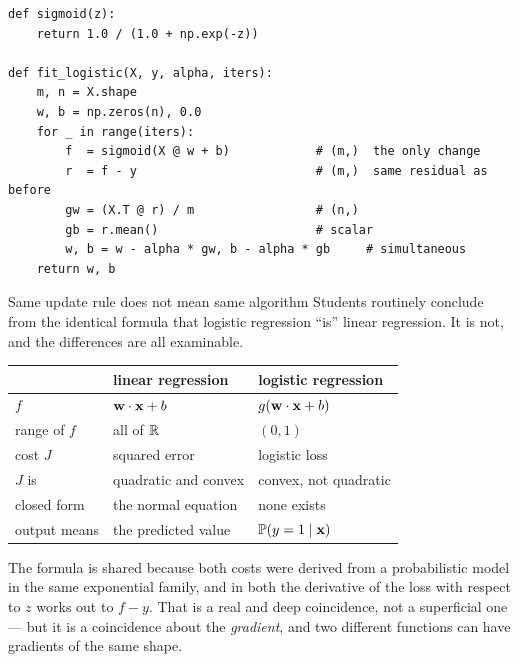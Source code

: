 \begin{lstlisting}[style=pythonml,caption={Logistic regression. Line~6 is the
only line that differs from the linear-regression implementation of
\cref{ch:ch04}.}]
def sigmoid(z):
    return 1.0 / (1.0 + np.exp(-z))

def fit_logistic(X, y, alpha, iters):
    m, n = X.shape
    w, b = np.zeros(n), 0.0
    for _ in range(iters):
        f  = sigmoid(X @ w + b)            # (m,)  the only change
        r  = f - y                         # (m,)  same residual as before
        gw = (X.T @ r) / m                 # (n,)
        gb = r.mean()                      # scalar
        w, b = w - alpha * gw, b - alpha * gb     # simultaneous
    return w, b
\end{lstlisting}

\begin{pitfall}{Same update rule does not mean same algorithm}
Students routinely conclude from the identical formula that logistic regression
``is'' linear regression. It is not, and the differences are all examinable.

\begin{center}
\small
\renewcommand{\arraystretch}{1.25}
\begin{tabular}{@{}L{2.7cm}L{3.9cm}L{3.9cm}@{}}
\toprule
 & \textbf{linear regression} & \textbf{logistic regression}\\
\midrule
$f$        & $\mathbf{w}\cdot\mathbf{x} + b$ & $g(\mathbf{w}\cdot\mathbf{x} + b)$\\
range of $f$ & all of $\mathbb{R}$ & $(0,1)$\\
cost $J$   & squared error & logistic loss\\
$J$ is     & quadratic and convex & convex, not quadratic\\
closed form & the normal equation & none exists\\
output means & the predicted value & $\mathbb{P}(y=1\mid\mathbf{x})$\\
\bottomrule
\end{tabular}
\end{center}

The formula is shared because both costs were derived from a probabilistic model
in the same exponential family, and in both the derivative of the loss with
respect to $z$ works out to $f - y$. That is a real and deep coincidence, not a
superficial one --- but it is a coincidence about the \emph{gradient}, and two
different functions can have gradients of the same shape.
\end{pitfall}


